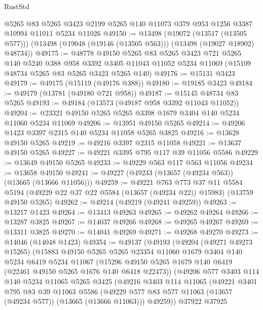 \begin{lexlean}{RustStd}
\begin{coremodule}
    @5265
    @83
    @5265
    @3423
    @2199
    @5265
    @140
    @11073
    @379
    @953
    @1256
    @3387
    @10994
    @11011
    @5234
    @11026
@49150 := @13498
    (@19072 (@13517 (@13505 @577)))
    (@13498 (@19048 (@19146 (@13505 @563))) (@13498 (@19027 @18902) @48734))
@49175 := @48778
    @49150
    @5265
    @83
    @5265
    @3423
    @721
    @5265
    @140
    @5240
    @388
    @958
    @3392
    @3405
    @11043
    @11052
    @5234
    @11069
    (@15109 @48734 @5265 @83 @5265 @3423 @5265 @140)
@49176 := @15131 @3423
@49179 := @49175 (@15119 (@49176 @388))
@49180 := @19185 @3423
@49184 := @49179 (@13781 (@49180 @721 @958))
@49187 := @15145 @48734 @83 @5265
@49193 := @49184 (@13573 (@49187 @958 @3392 @11043 @11052))
@49204 := @23321 @49150 @5265 @5265 @3398 @1679 @3404 @140 @5234 @11060 @5234 @11069
@49206 := @13951 @49150 @5265
@49214 := @49206 @1423 @3397 @2315 @140 @5234 @11058 @5265 @3825
@49216 := @13628 @49150 @5265
@49219 := @49216 @3397 @2315 @11058
@49221 := @13637 @49150 @5265
@49227 := @49221 @3395 @795 @117 @39 @11056 @5586
@49229 := @13649 @49150 @5265
@49233 := @49229 @563 @117 @563 @11056
@49234 := @13658 @49150
@49241 := @49227 (@49233 (@13657 (@49234 @563)) (@13665 (@13666 @11056)))
@49259 := @49221
    @763
    @773
    @37
    @11
    @5584
    @5194
    (@49229 @22 @37 @22 @5584 (@13657 (@49234 @22)) @15983)
    (@13759 @49150 @5265)
@49262 := @49214 (@49219 (@49241 @49259))
@49263 := @13217 @1423
@49264 := @13413 @49263
@49265 := @49262 @49264
@49266 := @13287 @3825
@49267 := @14037 @49266
@49268 := @49265 @49267
@49269 := @13311 @3825
@49270 := @14041 @49269
@49271 := @49268 @49270
@49273 := @14046 (@14048 @1423)
@49354 := @49137
    (@49193
      (@49204
        (@49271 @49273 @15265)
        (@15883
          @49150
          @5265
          @5265
          @23354
          @11060
          @1679
          @3404
          @140
          @5234
          @6419
          @5234
          @11067
          (@15296 @49150 @5265 @1679 @140 @6419 (@22461 @49150 @5265 @1676 @140 @6418 @22473))
          (@49206
            @577
            @3403
            @114
            @140
            @5234
            @11065
            @5265
            @3425
            (@49216
              @3403
              @114
              @11065
              (@49221
                @3401
                @795
                @83
                @39
                @11063
                @5586
                (@49229 @577 @83 @577 @11063 (@13657 (@49234 @577)) (@13665 (@13666 @11063)))
                @49259))
            @37922
            @37925

\end{coremodule}
\end{lexlean}
